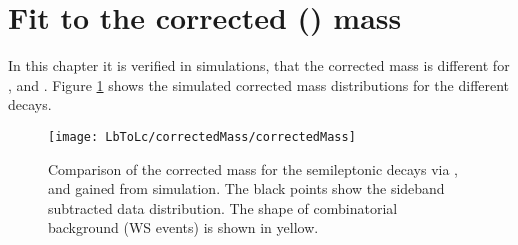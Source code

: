 \section{Fit to the corrected \pKpi\mun (\Lb) mass}
\label{sec:FitCorrectedMass}
In this chapter it is verified in simulations, that the corrected \pKpi\mun mass is different for \LbToLcmunu,  and .
Figure \ref{fig:correctedMass_normalisation} shows the simulated corrected \pKpi\mun mass distributions for the different decays.
\begin{figure}[hptb]
	\centering
	\texttt{[image: LbToLc/correctedMass/correctedMass]}
	\caption{Comparison of the \pKpi\mun corrected mass for the semileptonic \Lb decays via \Lc,  and  gained from simulation. The black points show the sideband subtracted data distribution. The shape of combinatorial \Lc\mun background (WS events) is shown in yellow.}
	\label{fig:correctedMass_normalisation}
\end{figure}

